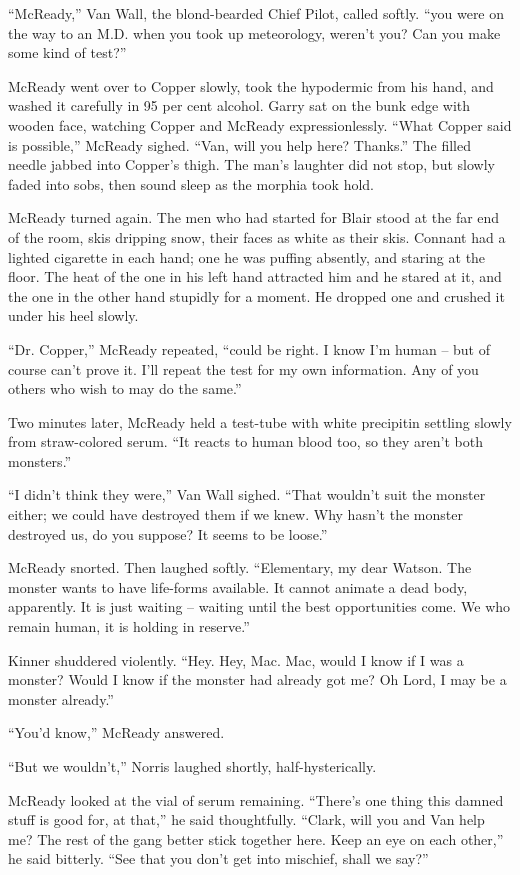 \documentclass[ebook,oneside,11pt]{memoir}				%
\begin{document}
``McReady,'' Van Wall, the blond-bearded Chief Pilot, called softly. ``you were on the way to an M.D. when you took up meteorology, weren't you? Can you make some kind of test?''

McReady went over to Copper slowly, took the hypodermic from his hand, and washed it carefully in 95 per cent alcohol. Garry sat on the bunk edge with wooden face, watching Copper and McReady expressionlessly. ``What Copper said is possible,'' McReady sighed. ``Van, will you help here? Thanks.'' The filled needle jabbed into Copper's thigh. The man's laughter did not stop, but slowly faded into sobs, then sound sleep as the morphia took hold.

McReady turned again. The men who had started for Blair stood at the far end of the room, skis dripping snow, their faces as white as their skis. Connant had a lighted cigarette in each hand; one he was puffing absently, and staring at the floor. The heat of the one in his left hand attracted him and he stared at it, and the one in the other hand stupidly for a moment. He dropped one and crushed it under his heel slowly.

``Dr. Copper,'' McReady repeated, ``could be right. I know I'm human -- but of course can't prove it. I'll repeat the test for my own information. Any of you others who wish to may do the same.''

Two minutes later, McReady held a test-tube with white precipitin settling slowly from straw-colored serum. ``It reacts to human blood too, so they aren't both monsters.''

``I didn't think they were,'' Van Wall sighed. ``That wouldn't suit the monster either; we could have destroyed them if we knew. Why hasn't the monster destroyed us, do you suppose? It seems to be loose.''

McReady snorted. Then laughed softly. ``Elementary, my dear Watson. The monster wants to have life-forms available. It cannot animate a dead body, apparently. It is just waiting -- waiting until the best opportunities come. We who remain human, it is holding in reserve.''

Kinner shuddered violently. ``Hey. Hey, Mac. Mac, would I know if I was a monster? Would I know if the monster had already got me? Oh Lord, I may be a monster already.''

``You'd know,'' McReady answered.

``But we wouldn't,'' Norris laughed shortly, half-hysterically.

McReady looked at the vial of serum remaining. ``There's one thing this damned stuff is good for, at that,'' he said thoughtfully. ``Clark, will you and Van help me? The rest of the gang better stick together here. Keep an eye on each other,'' he said bitterly. ``See that you don't get into mischief, shall we say?''
\end{document}
